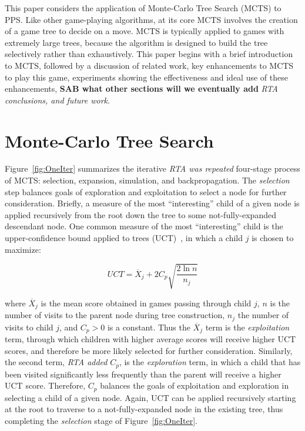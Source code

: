 \documentclass[letterpaper]{article}
\begin{document}
This paper considers the application of Monte-Carlo Tree Search (MCTS) to PPS. Like other game-playing algorithms, at its core MCTS involves the creation of a game tree to decide on a move. MCTS is typically applied to games with extremely large trees, because the algorithm is designed to build the tree selectively rather than exhaustively. This paper begins with a brief introduction to MCTS, followed by a discussion of related work, key enhancements to MCTS to play this game, experiments showing the effectiveness and ideal use of these enhancements, {\bf SAB what other sections will we eventually add} {\it RTA conclusions, and future work}.

\section{Monte-Carlo Tree Search}

Figure~\ref{fig:OneIter} summarizes the iterative {\it RTA was repeated} four-stage process of MCTS: selection, expansion, simulation, and backpropagation. The {\it selection} step balances goals of exploration and exploitation to select a node for further consideration. Briefly, a measure of the most ``interesting'' child of a given node is applied recursively from the root down the tree to some not-fully-expanded descendant node. One common measure of the most ``interesting'' child is the upper-confidence bound applied to trees (UCT)~\cite{kocsis2006improved}, in which a child $j$ is chosen to maximize:

\begin{equation} \label{eq:UCT}
UCT = \overline{X}_j + 2C_p\sqrt{\frac{2\ln{n}}{n_j}}
\end{equation}

\noindent where $\overline{X}_j$ is the mean score obtained in games passing through child $j$, $n$ is the number of visits to the parent node during tree construction, $n_j$ the number of visits to child $j$, and $C_p > 0$ is a constant. Thus the $\overline{X}_j$ term is the {\it exploitation} term, through which children with higher average scores will receive higher UCT scores, and therefore be more likely selected for further consideration. Similarly, the second term, {\it RTA added} $C_p$, is the {\it exploration} term, in which a child that has been visited significantly less frequently than the parent will receive a higher UCT score. Therefore, $C_p$ balances the goals of exploitation and exploration in selecting a child of a given node. Again, UCT can be applied recursively starting at the root to traverse to a not-fully-expanded node in the existing tree, thus completing the {\it selection} stage of Figure~\ref{fig:OneIter}.
\end{document}
